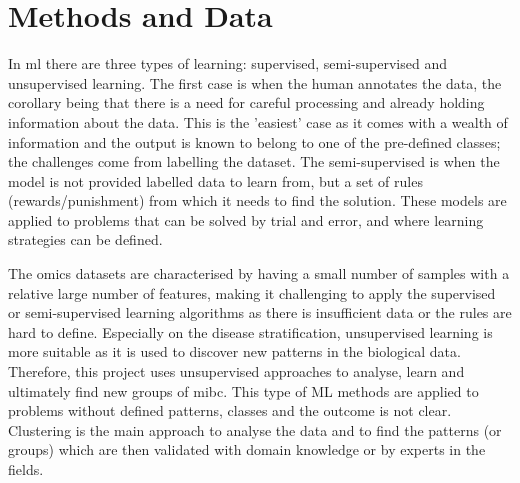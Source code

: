 \section{Methods and Data} \label{s:lit:computational}

\vspace{3mm}
\vspace{3mm}

In \acrfull{ml} there are three types of learning: supervised, semi-supervised and unsupervised learning. The first case is when the human annotates the data, the corollary being that there is a need for careful processing and already holding information about the data. This is the 'easiest' case as it comes with a wealth of information and the output is known to belong to one of the pre-defined classes; the challenges come from labelling the dataset. The semi-supervised is when the model is not provided labelled data to learn from, but a set of rules (rewards/punishment) from which it needs to find the solution. These models are applied to problems that can be solved by trial and error, and where learning strategies can be defined. 

The omics datasets are characterised by having a small number of samples with a relative large number of features, making it challenging to apply the supervised or semi-supervised learning algorithms as there is insufficient data or the rules are hard to define. Especially on the disease stratification, unsupervised learning is more suitable as it is used to discover new patterns in the biological data. Therefore, this project uses unsupervised approaches to analyse, learn and ultimately find new groups of \acrlong{mibc}. This type of ML methods are applied to problems without defined patterns, classes and the outcome is not clear. Clustering is the main approach to analyse the data and to find the patterns (or groups) which  are then validated with domain knowledge or by experts in the fields. 

